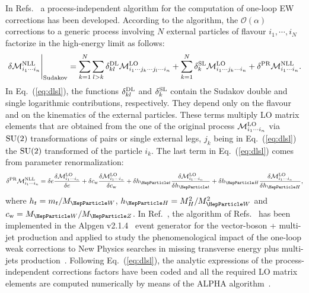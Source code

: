 \documentclass[11pt]{cernrep}
\begin{document}
In Refs.~\cite{Denner:2000jv,Denner:2001gw} a process-independent
algorithm for the computation of one-loop EW corrections has
been developed. According to the algorithm, the $\mathcal{O}(\alpha)$
corrections to a generic process involving $N$ external particles of
flavour $i_1, \cdots, i_N$ factorize in the high-energy limit as
follows:
\begin{equation}
\label{eq:dlsl}
\delta \mathcal{M}_{i_{1}\cdots i_{n}}^{\rm NLL} \Bigg|_{\rm Sudakov}=
\sum_{k=1}^{N}\sum_{l>k}\delta_{kl}^{\rm DL}\mathcal{M}_{i_{1}\cdots j_{k}\cdots j_{l}\cdots i_{n}}^{\rm LO} +
\sum_{k=1}^{N}\delta_{k}^{\rm SL}\mathcal{M}_{i_{1}\cdots j_{k}\cdots i_{n}}^{\rm LO}+
\delta^{\rm PR}\mathcal{M}_{i_{1}\cdots i_{n}}^{\rm NLL}. 
\end{equation}
In Eq.~(\ref{eq:dlsl}), the functions $\delta_{kl}^{\rm DL}$ and
$\delta_{k}^{\rm SL}$ contain the Sudakov double and single logarithmic
contributions, respectively. They depend only on the flavour and on
the kinematics of the external particles. These terms multiply
LO matrix elements that are obtained from the one of the
original process $\mathcal{M}_{i_{1}\cdots i_{n}}^{\rm LO}$ via $\rm SU(2)$
transformations of pairs or single external legs, $j_k$ being in
Eq.~(\ref{eq:dlsl}) the $\rm SU(2)$ transformed of the particle $i_k$. The
last term in Eq.~(\ref{eq:dlsl}) comes from parameter renormalization:
\begin{equation}
\label{eq:slpr}
\delta^{\rm PR}\mathcal{M}_{i_{1}\cdots i_{n}}^{\rm NLL}=
\delta e\frac{\delta\mathcal{M}_{i_{1}\cdots i_{n}}^{\rm LO}}{\delta e}+
\delta c_{\rm w}\frac{\delta\mathcal{M}_{i_{1}\cdots
    i_{n}}^{\rm LO}}{\delta c_{\rm w}}+
\delta h_{\PQt}\frac{\delta\mathcal{M}_{i_{1}\cdots i_{n}}^{\rm LO}}{\delta h_{\PQt}}+
\delta h_{\PH}\frac{\delta\mathcal{M}_{i_{1}\cdots i_{n}}^{\rm LO}}{\delta h_{\PH}},
\end{equation}
where $h_t=m_t/M_{\PW}$, $h_{\PH}=M_H^2/M_{\PW}^2$ and
$c_{\rm w}=M_{\PW}/M_{\PZ} $. In
Ref.~\cite{Chiesa:2013yma}, the algorithm of
Refs.~\cite{Denner:2000jv,Denner:2001gw} has been implemented in the
{\sc Alpgen v2.1.4}~\cite{Mangano:2002ea} event generator for the
vector-boson + multi-jet production and applied to study the phenomenological
impact of the one-loop weak corrections to New Physics searches in missing transverse energy plus multi-jets
production~\cite{Chiesa:2013yma,Mishra:2013una,Campbell:2013qaa,Butterworth:2014efa}.
Following Eq.~(\ref{eq:dlsl}), the analytic expressions of the
process-independent corrections factors have been coded and all the
required LO matrix elements are computed numerically by
means of the {\sc ALPHA} algorithm~\cite{Caravaglios:1995cd}.
\end{document}
